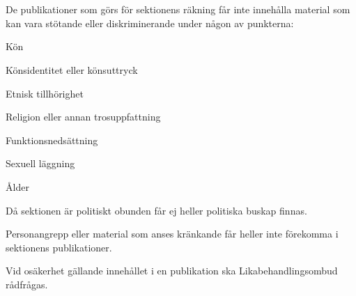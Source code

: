 \documentclass[10pt]{article}
\begin{document}
\section*{\doctitle}

De publikationer som görs för sektionens räkning får inte innehålla material som kan vara stötande eller diskriminerande under någon av punkterna:

\begin{dashlist}
\item Kön
\item Könsidentitet eller könsuttryck
\item Etnisk tillhörighet
\item Religion eller annan trosuppfattning
\item Funktionsnedsättning
\item Sexuell läggning
\item Ålder
\end{dashlist}

Då sektionen är politiskt obunden får ej heller politiska buskap finnas.

Personangrepp eller material som anses kränkande får heller inte förekomma i sektionens publikationer.

Vid osäkerhet gällande innehållet i en publikation ska Likabehandlingsombud rådfrågas.
\end{document}
